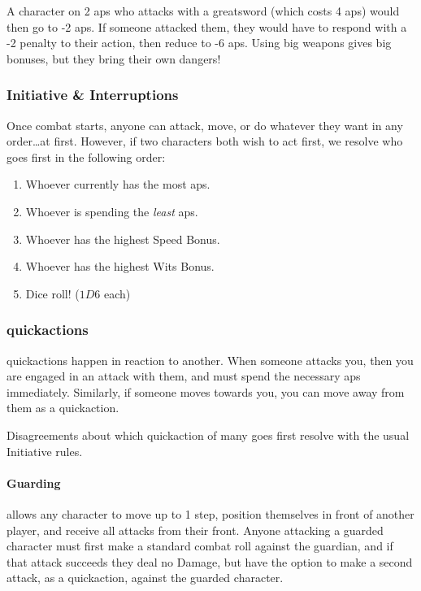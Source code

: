 \begin{multicols}{2}
\begin{exampletext}
  A character on 2 \glspl{ap} who attacks with a greatsword (which costs 4 \glspl{ap}) would then go to -2 \glspl{ap}.
  If someone attacked them, they would have to respond with a -2 penalty to their action, then reduce to -6 \glspl{ap}.
  Using big weapons gives big bonuses, but they bring their own dangers!
\end{exampletext}

\subsubsection{Initiative \& Interruptions}

Once combat starts, anyone can attack, move, or do whatever they want in any order\ldots at first.
However, if two characters both wish to act first, we resolve who goes first in the following order:

\begin{enumerate}
  \item
  Whoever currently has the most \glspl{ap}.
  \item
  Whoever is spending the \emph{least} \glspl{ap}.
  \item
  Whoever has the highest Speed Bonus.
  \item
  Whoever has the highest Wits Bonus.
  \item
  Dice roll! ($1D6$ each)
\end{enumerate}

\subsubsection{\Glspl{quickaction}}

\Glspl{quickaction} happen in reaction to another.
When someone attacks you, then you are engaged in an attack with them, and must spend the necessary \glspl{ap} immediately.
Similarly, if someone moves towards you, you can move away from them as a \gls{quickaction}.

Disagreements about which \gls{quickaction} of many goes first resolve with the usual Initiative rules.

\paragraph{Guarding}
\label{guarding}
allows any character to move up to 1 \gls{step}, position themselves in front of another player, and receive all attacks from their front.
Anyone attacking a guarded character must first make a standard combat roll against the guardian, and if that attack succeeds they deal no Damage, but have the option to make a second attack, as a \gls{quickaction}, against the guarded character.


\end{multicols}
